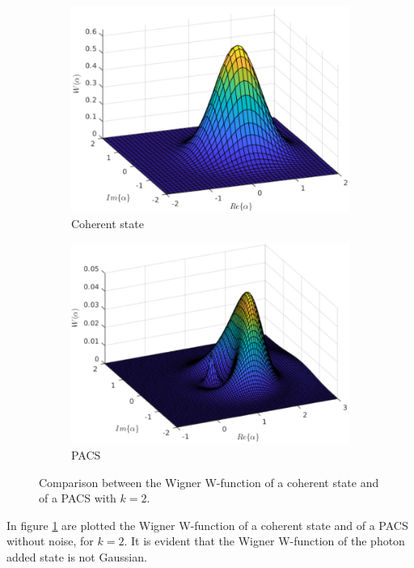         \begin{figure}[t]
            \begin{center}
                \begin{subfigure}{0.49\textwidth}
                    \includegraphics[width=\linewidth]{Pictures/WigCohState.pdf}
                    \caption{Coherent state}
                \end{subfigure}
                \begin{subfigure}{0.49\textwidth}
                    \includegraphics[width=\linewidth]{Pictures/WigPACS.pdf}
                    \caption{PACS}
                \end{subfigure}
                \caption{Comparison between the Wigner W-function of a coherent state and 
                of a PACS with $k=2$.}
                \label{fig:WignerPACS}
            \end{center}
        \end{figure}
        In figure \ref{fig:WignerPACS} are plotted the Wigner W-function of a coherent
        state and of a PACS without noise, for $k=2$. It is evident that the Wigner 
        W-function of the photon added state is not Gaussian.

